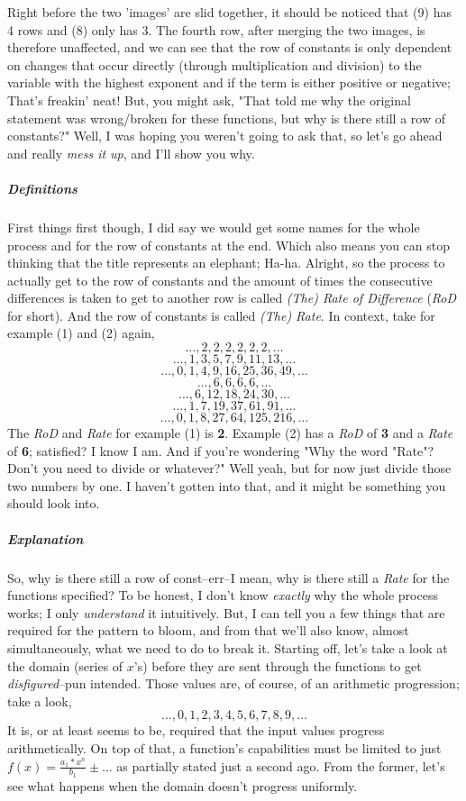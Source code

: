 \documentclass[12pt, letterpaper]{report}
\begin{document}
Right before the two 'images' are slid together, it should be noticed that (9) has 4 rows and (8) only has 3. The fourth row, after merging the two images, is therefore unaffected, and we can see that the row of constants is only dependent on changes that occur directly (through multiplication and division) to the variable with the highest exponent and if the term is either positive or negative; That's freakin' neat! But, you might ask, "That told me why the original statement was wrong/broken for these functions, but why is there still a row of constants?" Well, I was hoping you weren't going to ask that, so let's go ahead and really \textit{mess it up}, and I'll show you why.

\subparagraph{Definitions}First things first though, I did say we would get some names for the whole process and for the row of constants at the end. Which also means you can stop thinking that the title represents an elephant; Ha-ha. Alright, so the process to actually get to the row of constants and the amount of times the consecutive differences is taken to get to another row is called \textit{(The) Rate of Difference} (\textit{RoD} for short). And the row of constants is called \textit{(The) Rate}. In context, take for example (1) and (2) again,
$$\dots, 2, 2, 2, 2, 2, 2, \dots$$
$$\dots, 1, 3, 5, 7, 9, 11, 13, \dots$$
$$\dots, 0, 1, 4, 9, 16, 25, 36, 49, \dots$$
$$\dots, 6, 6, 6, 6, \dots$$
$$\dots, 6, 12, 18, 24, 30, \dots$$
$$\dots, 1, 7, 19, 37, 61, 91, \dots$$
$$\dots, 0, 1, 8, 27, 64, 125, 216, \dots$$
The \textit{RoD} and \textit{Rate} for example (1) is \textbf{2}. Example (2) has a \textit{RoD} of \textbf{3} and  a \textit{Rate} of \textbf{6}; satisfied? I know I am. And if you're wondering "Why the word "Rate"? Don't you need to divide or whatever?" Well yeah, but for now just divide those two numbers by one. I haven't gotten into that, and it might be something you should look into.

\subparagraph{Explanation}So, why is there still a row of const--err--I mean, why is there still a \textit{Rate} for the functions specified? To be honest, I don't know \textit{exactly} why the whole process works; I only \textit{understand} it intuitively. But, I can tell you a few things that are required for the pattern to bloom, and from that we'll also know, almost simultaneously, what we need to do to break it. Starting off, let's take a look at the domain (series of $x$'s) before they are sent through the functions to get \textit{disfigured}--pun intended. Those values are, of course, of an arithmetic progression; take a look,
\begin{equation}\dots, 0, 1, 2, 3, 4, 5, 6, 7, 8, 9, \dots\end{equation}
It is, or at least seems to be, required that the input values progress arithmetically. On top of that, a function's capabilities must be limited to just $f(x)=\frac{a_{1}*x^n}{b_{1}} \pm \dots$ as partially stated just a second ago. From the former, let's see what happens when the domain doesn't progress uniformly. \newline
\end{document}

